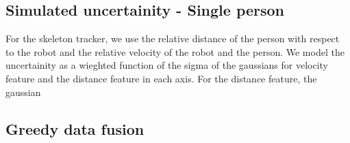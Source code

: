 \subsection{Simulated uncertainity - Single person}

For the skeleton tracker, we use the relative distance of the person with respect to the robot and the relative velocity of the robot and the person. We model the uncertainity as a wieghted function of the sigma of the gaussians for velocity feature and the distance feature in each axis. For the distance feature, the gaussian 

\subsection{Greedy data fusion}

